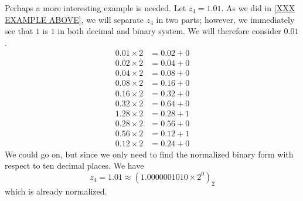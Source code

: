 \begin{exmp}
    Perhaps a more interesting example is needed. Let \(z_4 = 1.01\). As we did in \ref{XXX EXAMPLE ABOVE}, we will separate \(z_4\) in two parts; however, we immediately see that \(1\) is \(1\) in both decimal and binary system. We will therefore consider \(0.01\).
    \begin{align*}
        0.01 \times 2 &= 0.02 + 0 \\
        0.02 \times 2 &= 0.04 + 0 \\
        0.04 \times 2 &= 0.08 + 0 \\
        0.08 \times 2 &= 0.16 + 0 \\
        0.16 \times 2 &= 0.32 + 0 \\
        0.32 \times 2 &= 0.64 + 0 \\
        1.28 \times 2 &= 0.28 + 1 \\
        0.28 \times 2 &= 0.56 + 0 \\
        0.56 \times 2 &= 0.12 + 1 \\
        0.12 \times 2 &= 0.24 + 0
    \end{align*}
    We could go on, but since we only need to find the normalized binary form with respect to ten decimal places. We have
    \begin{equation*}
        z_4 = 1.01 \approx (1.0000001010 \times 2^0)_2
    \end{equation*}
    which is already normalized.
\end{exmp}
